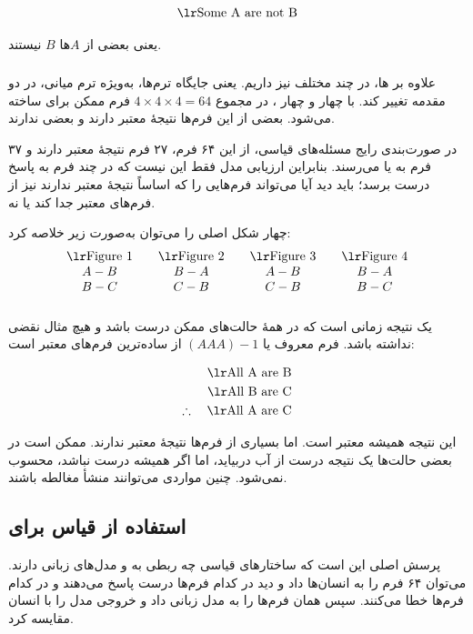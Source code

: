 \[
\text{\eng{Some A are not B}}
\]

یعنی بعضی از \(A\)ها \(B\) نیستند.

\subsubsection{}
علاوه بر ها، در  چند  مختلف نیز داریم.  یعنی جایگاه ترم‌ها، به‌ویژه ترم میانی، در دو مقدمه تغییر کند. با چهار  و چهار ، در مجموع \(4 \times 4 \times 4 = 64\) فرم ممکن برای  ساخته می‌شود. بعضی از این فرم‌ها نتیجهٔ معتبر دارند و بعضی ندارند.

در صورت‌بندی رایج مسئله‌های قیاسی، از این ۶۴ فرم، ۲۷ فرم نتیجهٔ معتبر دارند و ۳۷ فرم به  یا  می‌رسند. بنابراین ارزیابی مدل فقط این نیست که در چند فرم به پاسخ درست برسد؛ باید دید آیا می‌تواند فرم‌هایی را که اساساً نتیجهٔ معتبر ندارند نیز از فرم‌های معتبر جدا کند یا نه.

چهار شکل اصلی را می‌توان به‌صورت زیر خلاصه کرد:
\[
\begin{array}{c@{\qquad}c@{\qquad}c@{\qquad}c}
\text{\eng{Figure 1}} & \text{\eng{Figure 2}} & \text{\eng{Figure 3}} & \text{\eng{Figure 4}}\\
A-B & B-A & A-B & B-A\\
B-C & C-B & C-B & B-C
\end{array}
\]

\subsubsection{}
یک نتیجه زمانی  است که در همهٔ حالت‌های ممکن درست باشد و هیچ مثال نقضی نداشته باشد. فرم معروف  یا \((AAA)-1\) از ساده‌ترین فرم‌های معتبر است:

\begin{align*}
\text{\eng{All A are B}}\\
\text{\eng{All B are C}}\\
\therefore \quad \text{\eng{All A are C}}
\end{align*}

این نتیجه همیشه معتبر است. اما بسیاری از فرم‌ها نتیجهٔ معتبر ندارند. ممکن است در بعضی حالت‌ها یک نتیجه درست از آب دربیاید، اما اگر همیشه درست نباشد،  محسوب نمی‌شود. چنین مواردی می‌توانند منشأ مغالطه باشند.

\subsection{استفاده از قیاس برای }
پرسش اصلی این است که ساختارهای قیاسی چه ربطی به  و مدل‌های زبانی دارند. می‌توان ۶۴ فرم  را به انسان‌ها داد و دید در کدام فرم‌ها درست پاسخ می‌دهند و در کدام فرم‌ها خطا می‌کنند. سپس همان فرم‌ها را به مدل زبانی داد و خروجی مدل را با انسان مقایسه کرد.

